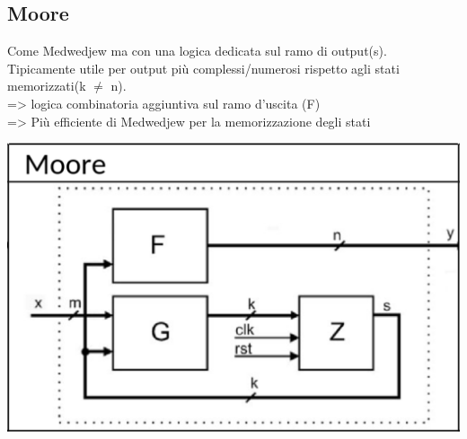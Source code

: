     \subsection{Moore}
    \begin{minipage}[t]{0.48\columnwidth}
        \vspace{0pt} %
        Come Medwedjew ma con una logica dedicata sul ramo di output(s).\\
        Tipicamente utile per output più complessi/numerosi rispetto agli stati memorizzati(k $\neq$ n).\\
        => logica combinatoria aggiuntiva sul ramo d'uscita (F)\\
        => Più efficiente di Medwedjew per la memorizzazione degli stati
    \end{minipage}%
    \hfill
    \begin{minipage}[t]{0.48\columnwidth}
        \vspace{0pt} %
        \includegraphics[width=\linewidth]{Images/Moore.png}
    \end{minipage}

